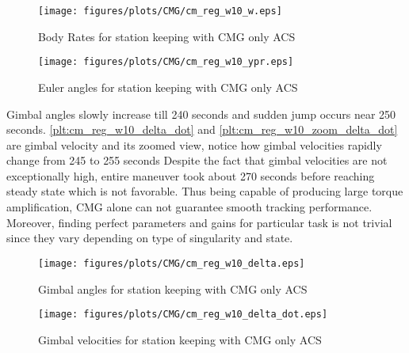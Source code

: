 \begin{figure}[H]
     \centering
    \texttt{[image: figures/plots/CMG/cm\_reg\_w10\_w.eps]}
    \caption{Body Rates for station keeping with CMG only ACS}
    \label{plt:cm_reg_w10_w}
\end{figure}



\begin{figure}[H]
     \centering
    \texttt{[image: figures/plots/CMG/cm\_reg\_w10\_ypr.eps]}
    \caption{Euler angles for station keeping with CMG only ACS}
    \label{plt:cm_reg_w10_ypr}
\end{figure}
\noindent Gimbal angles slowly increase till 240 seconds and sudden jump occurs near 250 seconds. \autoref{plt:cm_reg_w10_delta_dot} and \autoref{plt:cm_reg_w10_zoom_delta_dot} are gimbal velocity and its zoomed view, notice how gimbal velocities rapidly change from 245 to 255 seconds Despite the fact that gimbal velocities are not exceptionally high, entire maneuver took about 270 seconds before reaching steady state which is not favorable. Thus being capable of producing large torque amplification, CMG alone can not guarantee smooth tracking performance. Moreover, finding perfect parameters and gains for particular task is not trivial since they vary depending on type of singularity and state.
\begin{figure}[H]
     \centering
    \texttt{[image: figures/plots/CMG/cm\_reg\_w10\_delta.eps]}
    \caption{Gimbal angles for station keeping with CMG only ACS}
    \label{plt:cm_reg_w10_delta}
\end{figure}

\begin{figure}[H]
     \centering
    \texttt{[image: figures/plots/CMG/cm\_reg\_w10\_delta\_dot.eps]}
    \caption{Gimbal velocities for station keeping with CMG only ACS}
    \label{plt:cm_reg_w10_delta_dot}
\end{figure}

